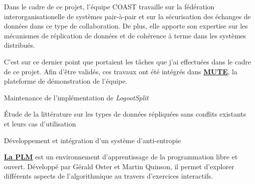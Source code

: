 \documentclass[12pt, a4paper]{awesome-cv}
\begin{document}
\begin{cventries}
\begin{cvparagraph}
    Dans le cadre de ce projet, l'équipe COAST travaille sur la fédération interorganisationelle de systèmes pair-à-pair et sur la sécurisation des échanges de données dans ce type de collaboration. De plus, elle apporte son expertise sur les mécanismes de réplication de données et de cohérence à terme dans les systèmes distribués.

    C'est sur ce dernier point que portaient les tâches que j'ai effectuées dans le cadre de ce projet.
    Afin d'être validés, ces travaux ont été intégrés dans \href{https://www.coedit.re}{\textbf{MUTE}}, la plateforme de démonstration de l'équipe.

    \begin{tightemize}
      \item Maintenance de l'implémentation de \emph{LogootSplit}
      \item Étude de la littérature sur les types de données répliquées sans conflits existants et leurs cas d'utilisation
      \item Développement et intégration d'un système d'anti-entropie
    \end{tightemize}

    \begin{description}[labelindent=1.6em,itemsep=-0.3em]
      \item {}
    \end{description}
  \end{cvparagraph}


  \begin{cvparagraph}
    \href{http://people.irisa.fr/Martin.Quinson/Teaching/PLM/}{\textbf{La PLM}} est un environnement d’apprentissage de la programmation libre et ouvert.
    Développé par Gérald Oster et Martin Quinson, il permet d’explorer différents aspects de l’algorithmique au travers d’exercices interactifs.


\end{cvparagraph}
\end{cventries}
\end{document}
